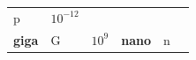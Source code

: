 {{\begin{center}
\begin{xtabular}[t]{|l|l|l|l|l|l|}
    
        p &
    
    
        
                \begin{math}{10}^{-12}\end{math}
     \tabularnewline{}
    
    
        
                \textbf{giga}
               &
    
    
        G &
    
    
        
                \begin{math}{10}^{9}\end{math}
               &
    
    
        
                \textbf{nano}
               &
    
    
        n &
    

\end{xtabular}
\end{center}}}
